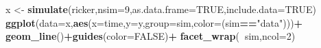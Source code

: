 \documentclass[]{article}
\newenvironment{Shaded}{\begin{snugshade}}{\end{snugshade}}
\newcommand{\KeywordTok}[1]{\textcolor[rgb]{0.13,0.29,0.53}{\textbf{#1}}}
\newcommand{\DataTypeTok}[1]{\textcolor[rgb]{0.13,0.29,0.53}{#1}}
\newcommand{\DecValTok}[1]{\textcolor[rgb]{0.00,0.00,0.81}{#1}}
\newcommand{\StringTok}[1]{\textcolor[rgb]{0.31,0.60,0.02}{#1}}
\newcommand{\OtherTok}[1]{\textcolor[rgb]{0.56,0.35,0.01}{#1}}
\newcommand{\OperatorTok}[1]{\textcolor[rgb]{0.81,0.36,0.00}{\textbf{#1}}}
\newcommand{\NormalTok}[1]{#1}
\begin{document}
\begin{Shaded}
\begin{Highlighting}[]
\NormalTok{x <-}\StringTok{ }\KeywordTok{simulate}\NormalTok{(ricker,}\DataTypeTok{nsim=}\DecValTok{9}\NormalTok{,}\DataTypeTok{as.data.frame=}\OtherTok{TRUE}\NormalTok{,}\DataTypeTok{include.data=}\OtherTok{TRUE}\NormalTok{)}
\KeywordTok{ggplot}\NormalTok{(}\DataTypeTok{data=}\NormalTok{x,}\KeywordTok{aes}\NormalTok{(}\DataTypeTok{x=}\NormalTok{time,}\DataTypeTok{y=}\NormalTok{y,}\DataTypeTok{group=}\NormalTok{sim,}\DataTypeTok{color=}\NormalTok{(sim}\OperatorTok{==}\StringTok{"data"}\NormalTok{)))}\OperatorTok{+}
\StringTok{  }\KeywordTok{geom_line}\NormalTok{()}\OperatorTok{+}\KeywordTok{guides}\NormalTok{(}\DataTypeTok{color=}\OtherTok{FALSE}\NormalTok{)}\OperatorTok{+}
\StringTok{  }\KeywordTok{facet_wrap}\NormalTok{(}\OperatorTok{~}\NormalTok{sim,}\DataTypeTok{ncol=}\DecValTok{2}\NormalTok{)}
\end{Highlighting}
\end{Shaded}

\begin{center} \end{center}
\end{document}
